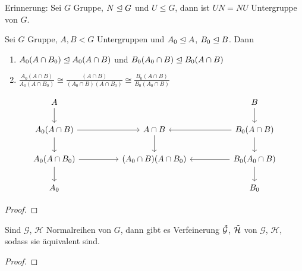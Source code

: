 \documentclass[../main.tex]{subfiles}
\begin{document}
Erinnerung: Sei $G$ Gruppe, $N \trianglelefteq G$ und $U\leq G$, dann ist $UN=NU$ Untergruppe von $G$. 
\begin{lemma}
Sei $G$ Gruppe, $A,B <G$ Untergruppen und $A_0 \trianglelefteq A$, $B_0 \trianglelefteq B$. Dann
\begin{enumerate}[label=(\alph*)]
        \item $A_0(A\cap B_0)\trianglelefteq A_0(A\cap B)$ und $B_0(A_0 \cap B) \trianglelefteq B_0(A\cap B)$
        \item $\frac{A_0(A\cap B)}{A_0(A\cap B_0)}\cong\frac{(A\cap B)}{(A_0\cap B)(A\cap B_0)}\cong \frac{B_0(A\cap B)}{B_0(A_0\cap B)}$
    \end{enumerate}
\end{lemma}
$$\begin{tikzcd}
A \arrow[d]                         &  &                        &  & B \arrow[d]                          \\
A_0(A\cap B) \arrow[rr] \arrow[d]   &  & A\cap B \arrow[d]      &  & B_0(A\cap B) \arrow[ll] \arrow[d]    \\
A_0(A\cap B_0) \arrow[rr] \arrow[d] &  & (A_0\cap B)(A\cap B_0) &  & B_0(A_0 \cap B) \arrow[ll] \arrow[d] \\
A_0                                 &  &                        &  & B_0                                 
\end{tikzcd}$$
\begin{proof}
    \TODO
\end{proof}

\begin{theorem}\label{theo:1.8}
    Sind $\mathcal{G}$, $\mathcal{H}$ Normalreihen von $G$, dann gibt es Verfeinerung $\Tilde{\mathcal{G}}$, $\Tilde{\mathcal{H}}$ von $\mathcal{G}$, $\mathcal{H}$, sodass sie äquivalent sind.
\end{theorem}
\begin{proof}
    \TODO
\end{proof}
\end{document}
